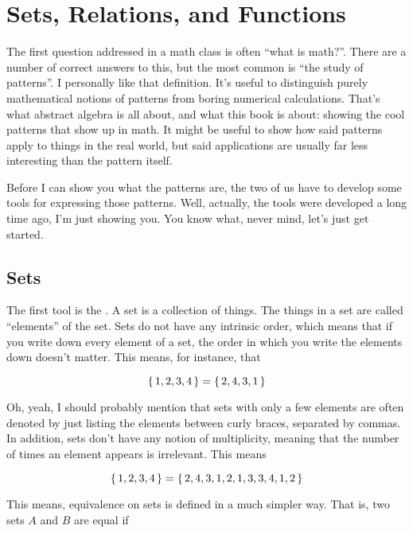 \chapter{Sets, Relations, and Functions}
\label{ch:functions}

The first question addressed in a math class is often ``what is math?''. There
are a number of correct answers to this, but the most common is ``the study of
patterns''. I personally like that definition. It's useful to distinguish purely
mathematical notions of patterns from boring numerical calculations. That's what
abstract algebra is all about, and what this book is about: showing the cool
patterns that show up in math. It might be useful to show how said patterns
apply to things in the real world, but said applications are usually far less
interesting than the pattern itself.

Before I can show you what the patterns are, the two of us have to develop some
tools for expressing those patterns. Well, actually, the tools were developed a
long time ago, I'm just showing you. You know what, never mind, let's just get
started.

\section{Sets}

The first tool is the . A set is a collection of things. The things in
a set are called ``elements'' of the set. Sets do not have any intrinsic order,
which means that if you write down every element of a set, the order in which
you write the elements down doesn't matter. This means, for instance, that

\begin{equation}
  \left\{\, 1,2,3,4 \,\right\} = \left\{\, 2,4,3,1 \,\right\}
\end{equation}

Oh, yeah, I should probably mention that sets with only a few elements are often
denoted by just listing the elements between curly braces, separated by
commas. In addition, sets don't have any notion of multiplicity, meaning that
the number of times an element appears is irrelevant. This means

\begin{equation}
  \left\{\, 1,2,3,4 \,\right\} = \left\{\, 2,4,3,1,2,1,3,3,4,1,2 \,\right\}
\end{equation}

This means, equivalence on sets is defined in a much simpler way. That is, two
sets $A$ and $B$ are equal if

